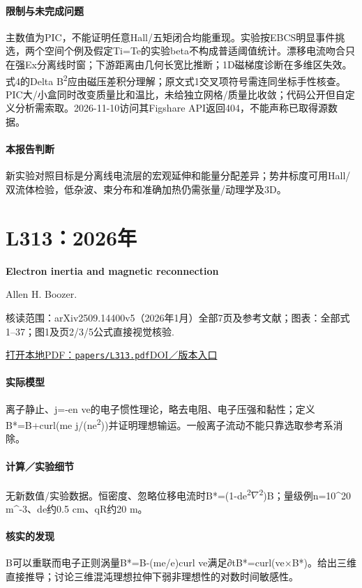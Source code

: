 \paragraph{限制与未完成问题}主数值为PIC，不能证明任意Hall/五矩闭合均能重现。实验按EBCS明显事件挑选，两个空间个例及假定Ti=Te的实验beta不构成普适阈值统计。漂移电流吻合只在强Ex分离线时窗；下游距离由几何长宽比推断；1D磁梯度诊断在多维区失效。式4的Delta B\textsuperscript{2}应由磁压差积分理解；原文式1交叉项符号需连同坐标手性核查。PIC大/小盒同时改变质量比和温比，未给独立网格/质量比收敛；代码公开但自定义分析需索取。2026-11-10访问其Figshare API返回404，不能声称已取得源数据。

\paragraph{本报告判断}新实验对照目标是分离线电流层的宏观延伸和能量分配差异；势井标度可用Hall/双流体检验，低杂波、束分布和准确加热仍需张量/动理学及3D。

\section{L313：2026年}\label{paper:L313}

\textbf{Electron inertia and magnetic reconnection}\citep{L313}\

Allen H. Boozer.

\textsf{核读范围：}arXiv2509.14400v5（2026年1月）全部7页及参考文献；\textsf{图表：}全部式1–37；图1及页2/3/5公式直接视觉核验.

\href{run:papers/L313.pdf}{打开本地PDF：\texttt{papers/L313.pdf}}\quad\href{https://doi.org/10.1063/5.0304789}{DOI／版本入口}

\paragraph{实际模型}离子静止、j=-en ve的电子惯性理论，略去电阻、电子压强和黏性；定义B*=B+curl(me j/(ne\textsuperscript{2}))并证明理想输运。一般离子流动不能只靠选取参考系消除。

\paragraph{计算／实验细节}无新数值/实验数据。恒密度、忽略位移电流时B*=(1-de\textsuperscript{2}\ensuremath{\nabla}\textsuperscript{2})B；量级例n=10\textasciicircum{}20 m\textasciicircum{}-3、de约0.5 cm、qR约20 m。

\paragraph{核实的发现}B可以重联而电子正则涡量B*=B-(me/e)curl ve满足∂tB*=curl(ve×B*)。给出三维直接推导；讨论三维混沌理想拉伸下弱非理想性的对数时间敏感性。

